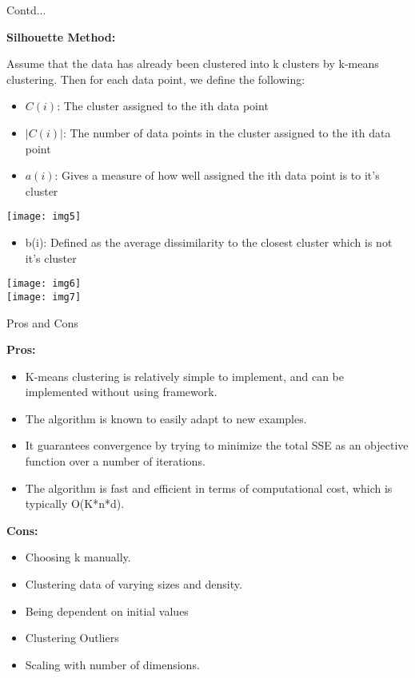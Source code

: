 \documentclass{beamer}
\newcommand\myheading[1]{%
  \par\bigskip
  {\large\bfseries#1}\par\smallskip}
\begin{document}
\begin{frame}{Contd...}
	\begin{flushleft}
	\myheading{Silhouette Method:}
	Assume that the data has already been clustered into k clusters by k-means clustering. Then for each data point, we define the following:
	\begin{itemize}
		\item $C(i)$: The cluster assigned to the ith data point
		\item $|C(i)|$: The number of data points in the cluster assigned to the ith data point
		\item $a(i)$: Gives a measure of how well assigned the ith data point is to it’s cluster
	\end{itemize}
	\end{flushleft}
	\texttt{[image: img5]}
	\begin{flushleft}
		\begin{itemize}
			\item b(i): Defined as the average dissimilarity to the closest cluster which is not it’s cluster
		\end{itemize}
	\end{flushleft}
	\texttt{[image: img6]}\\
	\vspace{10pt}
	\texttt{[image: img7]}
\end{frame}

\begin{frame}{Pros and Cons}
	\begin{flushleft}
		\myheading{Pros:}
		\begin{itemize}
			\item K-means clustering is relatively simple to implement, and can be implemented without using framework.
			\item The algorithm is known to easily adapt to new examples.
			\item It guarantees convergence by trying to minimize the total SSE as an objective function over a number of iterations.
			\item The algorithm is fast and efficient in terms of computational cost, which is typically O(K*n*d).
		\end{itemize}
		\myheading{Cons:}
		\begin{itemize}
			\item Choosing k manually.
			\item Clustering data of varying sizes and density.
			\item Being dependent on initial values
			\item Clustering Outliers
			\item Scaling with number of dimensions.
		\end{itemize}
	\end{flushleft}
\end{frame}
\end{document}
